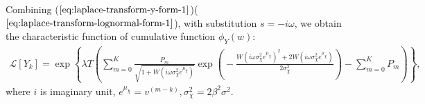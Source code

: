 Combining ($\ref{eq:laplace-transform-y-form-1}$)($\ref{eq:laplace-transform-lognormal-form-1}$), with substitution $s = -i\omega$,  we obtain the characteristic function of cumulative function $\phi_Y\left(w\right)$:
\begin{align}
	\mathcal{L}\left[ Y_k\right] \!= \! \exp \!\! \left\lbrace \!\!\! \lambda T \!\! \left( \!\!\!\sum_{m=0}^{K} \!\frac{P_m}{\sqrt{1 + W\!(i \omega \sigma_{\chi}^2 e^{\mu_{\chi}})}} \exp( \!-\frac{W\!\!\left( i \omega\sigma_{\chi}^2 e^{\mu_{\chi}}\right)^2  + 2W\!\!\left( i \omega \sigma_{\chi}^2e^{\mu_{\chi}}\right)}{2\sigma_{\chi}^2} \!)
	\!- \!\!\!\sum_{m=0}^{K} \!\!P_m \!\! \right) \!\!\!\right\rbrace \nonumber,
\end{align}
where $i$ is imaginary unit, $e^{\mu_{\chi}} = v^{\left(m-k\right)}, \sigma^2_{\chi} = 2\beta^2\sigma^2$.

